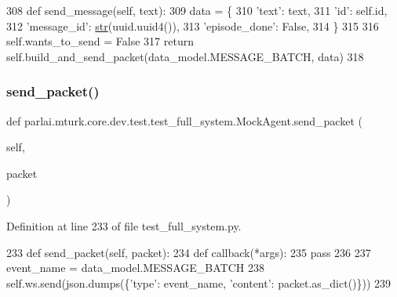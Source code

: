\begin{DoxyCode}
308     \textcolor{keyword}{def }send\_message(self, text):
309         data = \{
310             \textcolor{stringliteral}{'text'}: text,
311             \textcolor{stringliteral}{'id'}: self.id,
312             \textcolor{stringliteral}{'message\_id'}: \hyperlink{namespacegenerate__task__READMEs_a5b88452ffb87b78c8c85ececebafc09f}{str}(uuid.uuid4()),
313             \textcolor{stringliteral}{'episode\_done'}: \textcolor{keyword}{False},
314         \}
315 
316         self.wants\_to\_send = \textcolor{keyword}{False}
317         \textcolor{keywordflow}{return} self.build\_and\_send\_packet(data\_model.MESSAGE\_BATCH, data)
318 
\end{DoxyCode}
\mbox{\label{classparlai_1_1mturk_1_1core_1_1dev_1_1test_1_1test__full__system_1_1MockAgent_a439c09f491611c9d91aea875f44ac435}} 
\subsubsection{\texorpdfstring{send\+\_\+packet()}{send\_packet()}}
{\footnotesize\ttfamily def parlai.\+mturk.\+core.\+dev.\+test.\+test\+\_\+full\+\_\+system.\+Mock\+Agent.\+send\+\_\+packet (\begin{DoxyParamCaption}\item[{}]{self,  }\item[{}]{packet }\end{DoxyParamCaption})}



Definition at line 233 of file test\+\_\+full\+\_\+system.\+py.


\begin{DoxyCode}
233     \textcolor{keyword}{def }send\_packet(self, packet):
234         \textcolor{keyword}{def }callback(*args):
235             \textcolor{keywordflow}{pass}
236 
237         event\_name = data\_model.MESSAGE\_BATCH
238         self.ws.send(json.dumps(\{\textcolor{stringliteral}{'type'}: event\_name, \textcolor{stringliteral}{'content'}: packet.as\_dict()\}))
239 
\end{DoxyCode}


